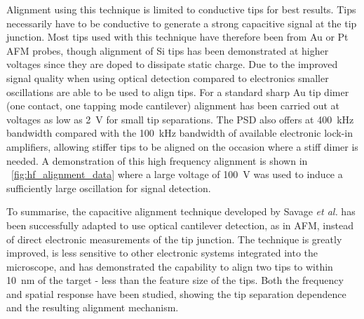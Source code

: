 \documentclass{article}
\begin{document}
Alignment using this technique is limited to conductive tips for best results. Tips necessarily have to be conductive to generate a strong capacitive signal at the tip junction. Most tips used with this technique have therefore been from Au or Pt AFM probes, though alignment of Si tips has been demonstrated at higher voltages since they are doped to dissipate static charge. Due to the improved signal quality when using optical detection compared to electronics smaller oscillations are able to be used to align tips. For a standard sharp Au tip dimer (one contact, one tapping mode cantilever) alignment has been carried out at voltages as low as \SI{2}{V} for small tip separations. The PSD also offers at \SI{400}{kHz} bandwidth compared with the \SI{100}{kHz} bandwidth of available electronic lock-in amplifiers, allowing stiffer tips to be aligned on the occasion where a stiff dimer is needed. A demonstration of this high frequency alignment is shown in \figurename~\ref{fig:hf_alignment_data} where a large voltage of \SI{100}{V} was used to induce a sufficiently large oscillation for signal detection.

To summarise, the capacitive alignment technique developed by Savage \textit{et al.} \cite{savage2011} has been successfully adapted to use optical cantilever detection, as in AFM, instead of direct electronic measurements of the tip junction. The technique is greatly improved, is less sensitive to other electronic systems integrated into the microscope, and has demonstrated the capability to align two tips to within \SI{10}{nm} of the target - less than the feature size of the tips. Both the frequency and spatial response have been studied, showing the tip separation dependence and the resulting alignment mechanism.
\end{document}
